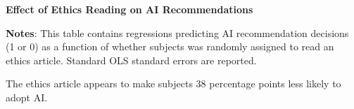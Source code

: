 \documentclass[11pt]{article}
\begin{document}
\begin{table}[htbp]
\caption{\textbf{Effect of Ethics Reading on AI Recommendations}
\label{tab:EngApproach}}
\flushleft
	
    \flushleft
    \begin{footnotesize}
    \textbf{Notes}: This table contains regressions predicting AI recommendation decisions (1 or 0) as a function of whether subjects was randomly assigned to read an ethics article. Standard OLS standard errors are reported.  
    \end{footnotesize}
\end{table}

The ethics article appears to make subjects 38 percentage points less likely to adopt AI.
\end{document}
